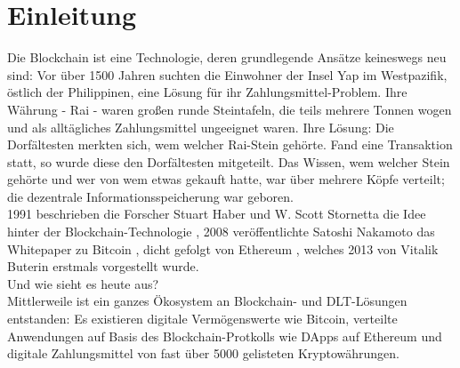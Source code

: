 \chapter{Einleitung}
\label{ch:intro}
Die Blockchain ist eine Technologie, deren grundlegende Ansätze keineswegs neu sind: Vor über 1500 Jahren suchten die Einwohner der Insel Yap im Westpazifik, östlich der Philippinen, eine Lösung für ihr Zahlungsmittel-Problem. Ihre Währung - Rai - waren großen runde Steintafeln, die teils mehrere Tonnen wogen und als alltägliches Zahlungsmittel ungeeignet waren. Ihre Lösung: Die Dorfältesten merkten sich, wem welcher Rai-Stein gehörte. Fand eine Transaktion statt, so wurde diese den Dorfältesten mitgeteilt. Das Wissen, wem welcher Stein gehörte und wer von wem etwas gekauft hatte, war über mehrere Köpfe verteilt; die dezentrale Informationsspeicherung war geboren. \cite{forbes2018}\\
1991 beschrieben die Forscher Stuart Haber und W. Scott Stornetta die Idee hinter der Blockchain-Technologie \cite{binance2019}, 2008 veröffentlichte Satoshi Nakamoto das Whitepaper zu Bitcoin \cite{nakamoto2009}, dicht gefolgt von Ethereum \cite{buterin2013}, welches 2013 von Vitalik Buterin erstmals vorgestellt wurde.\\
Und wie sieht es heute aus?\\
Mittlerweile ist ein ganzes Ökosystem an Block\-chain- und \ac{DLT}-Lösungen entstanden: Es existieren digitale Vermögenswerte wie Bitcoin, verteilte Anwendungen auf Basis des Blockchain-Protkolls wie \acp{DApp} auf Ethereum und digitale Zahlungsmittel von fast über 5000 gelisteten Kryptowährungen.\\


%
%
